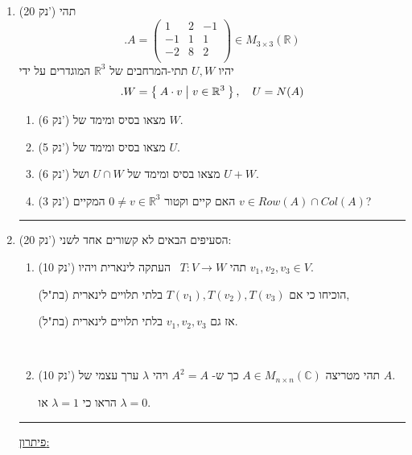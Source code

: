 \documentclass[12pt, a4paper]{article}
\newcommand{\cc}{\mathbb{C}}
\newcommand{\rr}{\mathbb{R}}
\newcommand{\points}[1]{(#1 נק') }
\begin{document}
\begin{enumerate}
\pagebreak

\newcommand{\thirdQ}{
\item\points{20}
תהי
$$.A=\begin{pmatrix}
1&2&-1\\
-1&1&1\\
-2&8&2\\
\end{pmatrix}
\in M_{3\times 3}(\rr)$$
יהיו
$U,W$
תתי-המרחבים של
$\rr^3$
המוגדרים על ידי
$$.W=\Set{A\cdot v | v\in \rr^3},\quad
U=N(A)
$$
\begin{enumerate}
\item\points{6}
מצאו בסיס ומימד של
$W$.
\item\points{5}
מצאו בסיס ומימד של
$U$.
\item\points{6}
מצאו בסיס ומימד של
$U\cap W$ ושל $U+W$.
\item
\points{3}
האם קיים וקטור
$0\neq v\in\rr^3$
המקיים
$v\in Row(A)\cap Col(A)$?
\end{enumerate}

}
\thirdQ

\noindent\rule{\textwidth-30pt}{0.4pt}
\newcommand{\forthQ}{
    \item \points{20}
    הסעיפים הבאים לא קשורים אחד לשני:
    \begin{enumerate}
        \item\points{10} 
        תהי $T:V\to W$ \ 
        העתקה לינארית
        ויהיו
        $v_1,v_2,v_3\in V$.
        
        הוכיחו כי אם
        $T(v_1),T(v_2),T(v_3)$
        בלתי תלויים לינארית (בת"ל),
        
        אז גם
        $v_1,v_2,v_3$
        בלתי תלויים לינארית (בת"ל).

        \ 
        
        \item\points{10} 
        תהי מטריצה $A\in M_{n\times n}(\cc)$ כך ש- $A^2=A$ ויהי
        $\lambda$
        ערך עצמי של $A$.

        הראו כי
        $\lambda=1$ או $\lambda = 0$.
    
    \end{enumerate}
}\forthQ
\pagebreak
\setcounter{enumi}{0}
    \firstQ
\noindent\rule{\textwidth-30pt}{0.4pt}
\underline{פיתרון:}
    
    \pagebreak \ 
    \ 
    

\end{enumerate}
\end{document}
